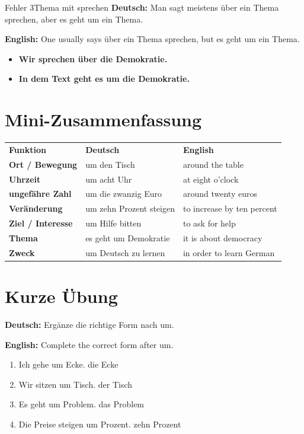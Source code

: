 \documentclass[a4paper,11pt]{article}
\newcommand{\GermanText}[1]{\textbf{Deutsch: }#1\par}
\newcommand{\EnglishText}[1]{{\small\color{SoftGray}\textbf{English: }#1\par}}
\newcommand{\Correct}[1]{\textcolor{HeaderBlueDark}{\textbf{#1}}}
\begin{document}
\begin{grammarentry}{Fehler 3}{Thema mit sprechen}
\GermanText{Man sagt meistens \glqq über ein Thema sprechen\grqq, aber \glqq es geht um ein Thema\grqq.}
\EnglishText{One usually says \glqq über ein Thema sprechen\grqq, but \glqq es geht um ein Thema\grqq.}
\begin{itemize}
    \item \Correct{Wir sprechen über die Demokratie.}
    \item \Correct{In dem Text geht es um die Demokratie.}
\end{itemize}
\end{grammarentry}

\section{Mini-Zusammenfassung}

\begin{tabularx}{\textwidth}{>{\bfseries}p{}X X}
\rowcolor{HeaderBlueDark}
\color{white}\textbf{Funktion} & \color{white}\textbf{Deutsch} & \color{white}\textbf{English} \\
Ort / Bewegung & um den Tisch & around the table \\
Uhrzeit & um acht Uhr & at eight o'clock \\
ungefähre Zahl & um die zwanzig Euro & around twenty euros \\
Veränderung & um zehn Prozent steigen & to increase by ten percent \\
Ziel / Interesse & um Hilfe bitten & to ask for help \\
Thema & es geht um Demokratie & it is about democracy \\
Zweck & um Deutsch zu lernen & in order to learn German \\
\end{tabularx}

\section{Kurze Übung}

\GermanText{Ergänze die richtige Form nach \glqq um\grqq.}
\EnglishText{Complete the correct form after \glqq um\grqq.}

\begin{enumerate}
    \item Ich gehe um \underline{\hspace{2.5cm}} Ecke. \hfill die Ecke
    \item Wir sitzen um \underline{\hspace{2.5cm}} Tisch. \hfill der Tisch
    \item Es geht um \underline{\hspace{2.5cm}} Problem. \hfill das Problem
    \item Die Preise steigen um \underline{\hspace{2.5cm}} Prozent. \hfill zehn Prozent
\end{enumerate}
\end{document}
